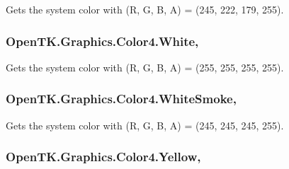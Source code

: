 Gets the system color with (R, G, B, A) = (245, 222, 179, 255). 

\hypertarget{struct_open_t_k_1_1_graphics_1_1_color4_a3a5f6333012a2b9aeef979515b512a83}{
\subsubsection[{White}]{ Open\-T\-K.\-Graphics.\-Color4.\-White\hspace{0.3cm}{\ttfamily [static]}, {\ttfamily [get]}}}\label{struct_open_t_k_1_1_graphics_1_1_color4_a3a5f6333012a2b9aeef979515b512a83}


Gets the system color with (R, G, B, A) = (255, 255, 255, 255). 

\hypertarget{struct_open_t_k_1_1_graphics_1_1_color4_a4bff083cb6b57cab59b9810a1b208aca}{
\subsubsection[{White\-Smoke}]{ Open\-T\-K.\-Graphics.\-Color4.\-White\-Smoke\hspace{0.3cm}{\ttfamily [static]}, {\ttfamily [get]}}}\label{struct_open_t_k_1_1_graphics_1_1_color4_a4bff083cb6b57cab59b9810a1b208aca}


Gets the system color with (R, G, B, A) = (245, 245, 245, 255). 

\hypertarget{struct_open_t_k_1_1_graphics_1_1_color4_a6e91164b460de05342c71c1fa5a2249e}{
\subsubsection[{Yellow}]{ Open\-T\-K.\-Graphics.\-Color4.\-Yellow\hspace{0.3cm}{\ttfamily [static]}, {\ttfamily [get]}}}\label{struct_open_t_k_1_1_graphics_1_1_color4_a6e91164b460de05342c71c1fa5a2249e}


